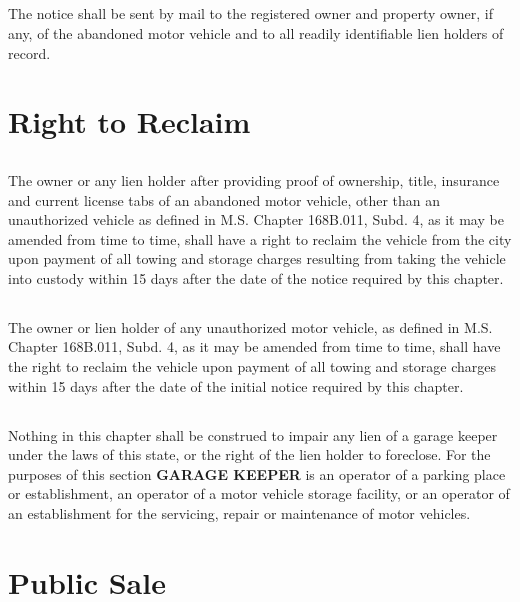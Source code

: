 \subsection{}
The notice shall be sent by mail to the registered owner and property owner, if any, of the abandoned motor vehicle and to all readily identifiable lien holders of record.

\section{Right to Reclaim}
\subsection{}
The owner or any lien holder after providing proof of ownership, title, insurance and current license tabs of an abandoned motor vehicle, other than an unauthorized vehicle as defined in M.S. Chapter 168B.011, Subd. 4, as it may be amended from time to time, shall have a right to reclaim the vehicle from the city upon payment of all towing and storage charges resulting from taking the vehicle into custody within 15 days after the date of the notice required by this chapter.
\subsection{}
The owner or lien holder of any unauthorized motor vehicle, as defined in M.S. Chapter 168B.011, Subd. 4, as it may be amended from time to time, shall have the right to reclaim the vehicle upon payment of all towing and storage charges within 15 days after the date of the initial notice required by this chapter.
\subsection{}
Nothing in this chapter shall be construed to impair any lien of a garage keeper under the laws of this state, or the right of the lien holder to foreclose.  For the purposes of this section \textbf{GARAGE KEEPER} is an operator of a parking place or establishment, an operator of a motor vehicle storage facility, or an operator of an establishment for the servicing, repair or maintenance of motor vehicles.

\section{Public Sale}
